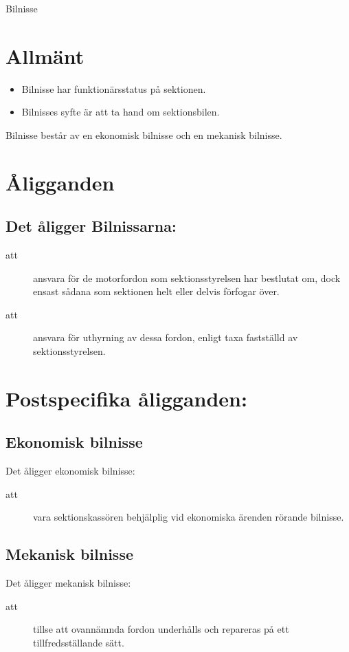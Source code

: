 \documentclass[a4paper]{article}
\begin{document}
\renewcommand{\forening}{Bilnisse} %

\begin{foreningenv}{\forening{}} %
    \section{Allmänt}
    \begin{itemize}
        \item Bilnisse har funktionärsstatus på sektionen.
        \item Bilnisses syfte är att ta hand om sektionsbilen.
    \end{itemize}
    Bilnisse består av en ekonomisk bilnisse och en mekanisk bilnisse.
    
    \section{Åligganden}
    \aliggsektfunkt{} %
        
    \subsection{Det åligger Bilnissarna:}
    \begin{description}
          \item[att] ansvara för de motorfordon som sektionsstyrelsen har bestlutat om, dock ensast sådana som sektionen helt eller delvis förfogar över.
          \item[att] ansvara för uthyrning av dessa fordon, enligt taxa fastställd av sektionsstyrelsen.
    \end{description}
    
    \section{Postspecifika åligganden:}
    \subsection{Ekonomisk bilnisse}
    Det åligger ekonomisk bilnisse:
    \begin{description}
          \item[att] vara sektionskassören behjälplig vid ekonomiska ärenden rörande bilnisse. 
    \end{description}
    
    \subsection{Mekanisk bilnisse}
    Det åligger mekanisk bilnisse:
    \begin{description}
          \item[att] tillse att ovannämnda fordon underhålls och repareras på ett tillfredsställande sätt.
    \end{description}
\end{foreningenv}
\end{document}
